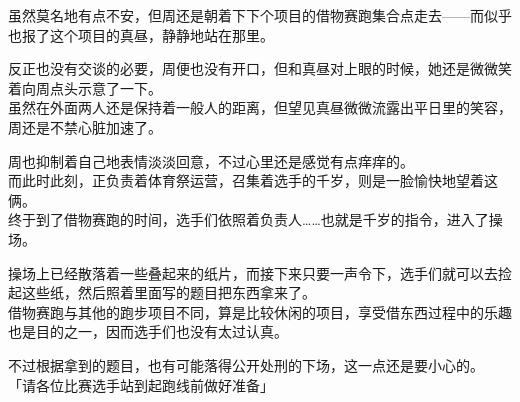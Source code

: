虽然莫名地有点不安，但周还是朝着下下个项目的借物赛跑集合点走去——而似乎也报了这个项目的真昼，静静地站在那里。

反正也没有交谈的必要，周便也没有开口，但和真昼对上眼的时候，她还是微微笑着向周点头示意了一下。\\

虽然在外面两人还是保持着一般人的距离，但望见真昼微微流露出平日里的笑容，周还是不禁心脏加速了。

周也抑制着自己地表情淡淡回意，不过心里还是感觉有点痒痒的。\\

而此时此刻，正负责着体育祭运营，召集着选手的千岁，则是一脸愉快地望着这俩。\\



终于到了借物赛跑的时间，选手们依照着负责人……也就是千岁的指令，进入了操场。

操场上已经散落着一些叠起来的纸片，而接下来只要一声令下，选手们就可以去捡起这些纸，然后照着里面写的题目把东西拿来了。\\

借物赛跑与其他的跑步项目不同，算是比较休闲的项目，享受借东西过程中的乐趣也是目的之一，因而选手们也没有太过认真。

不过根据拿到的题目，也有可能落得公开处刑的下场，这一点还是要小心的。\\

「请各位比赛选手站到起跑线前做好准备」

